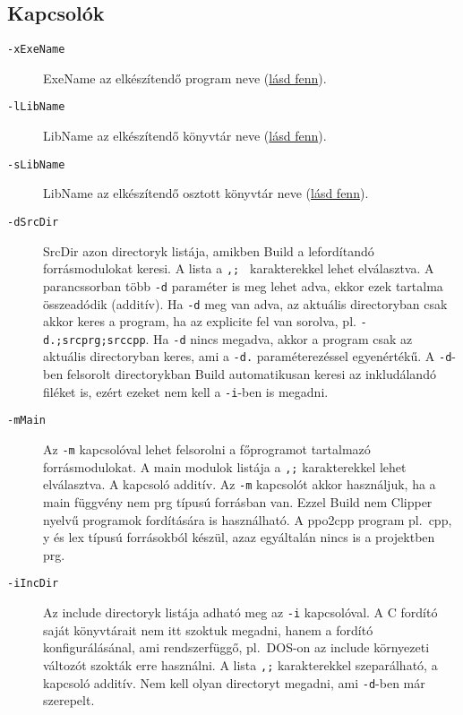 \subsection{Kapcsolók}
\begin{description}
\item[{\tt -xExeName}] 
  ExeName az elkészítendő program neve (\href{#switchx}{lásd fenn}).

\item[{\tt -lLibName}] 
  LibName az elkészítendő könyvtár neve (\href{#switchl}{lásd fenn}).

\item[{\tt -sLibName}] 
  LibName az elkészítendő osztott könyvtár neve (\href{#switchs}{lásd fenn}).
 

\item[{\tt -dSrcDir}] 
  SrcDir azon directoryk listája, amikben Build a lefordítandó
  forrásmodulokat keresi.   
  A lista a {\tt,; } karakterekkel lehet elválasztva.
  A parancssorban több {\tt -d} paraméter is meg lehet adva, ekkor ezek
  tartalma összeadódik (additív). Ha {\tt -d} meg van adva, az aktuális 
  directoryban csak akkor keres a program, ha az explicite fel van sorolva, 
  pl. \verb'-d.;srcprg;srccpp'.
  Ha {\tt -d} nincs megadva, akkor a program csak az aktuális directoryban
  keres, ami a \verb'-d.' paraméterezéssel egyenértékű.
  A {\tt -d}-ben felsorolt directorykban Build automatikusan
  keresi az inkludálandó filéket is, ezért ezeket nem kell a {\tt -i}-ben 
  is megadni.


\item[{\tt -mMain}] 
  Az {\tt -m} kapcsolóval lehet felsorolni a főprogramot
  tartalmazó forrásmodulokat. A main modulok listája a {\tt,;} 
  karakterekkel lehet elválasztva. A kapcsoló additív.
  Az {\tt -m} kapcsolót akkor használjuk, ha a main függvény nem 
  prg  típusú forrásban van. Ezzel Build nem Clipper nyelvű programok
  fordítására is használható. A ppo2cpp program pl.\  cpp, y és lex 
  típusú forrásokból készül, azaz egyáltalán nincs is a projektben prg. 


\item[{\tt -iIncDir}] 
  Az include directoryk listája adható meg az {\tt -i} kapcsolóval.
  A C fordító saját könyvtárait nem itt szoktuk megadni, hanem 
  a fordító konfigurálásánal, ami rendszerfüggő, pl.\ DOS-on az 
  include környezeti változót szokták erre használni.  
  A lista {\tt ,;} karakterekkel szeparálható, a kapcsoló additív. 
  Nem kell olyan directoryt megadni, ami {\tt -d}-ben már szerepelt.



\end{description}
